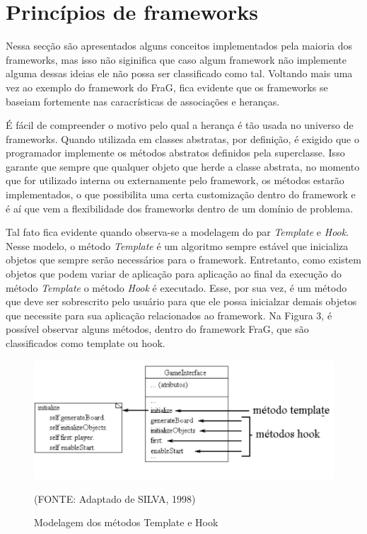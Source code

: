 \documentclass[
    12pt,       %
    openright,      %
    twoside,      %
    a4paper,      %
    english,      %
    french,       %
    spanish,      %
    brazil,       %
    ]{abntex2}
\begin{document}
      \section{Princípios de frameworks}
          Nessa secção são apresentados alguns conceitos implementados pela maioria
          dos frameworks, mas isso não siginifica que caso algum framework não implemente
          alguma dessas ideias ele não possa ser classificado como tal. Voltando mais uma
          vez ao exemplo do framework do FraG, fica evidente que os frameworks se baseiam
          fortemente nas caracrísticas de associações e heranças.

          É fácil de compreender o motivo pelo qual a herança é tão usada no universo de
          frameworks. Quando utilizada em classes abstratas, por definição, é exigido que
          o programador implemente os métodos abstratos definidos pela superclasse. Isso
          garante que sempre que qualquer objeto que herde a classe abstrata, no momento
          que for utilizado interna ou externamente pelo framework, os métodos estarão
          implementados, o que possibilita uma certa customização dentro do framework e
          é aí que vem a flexibilidade dos frameworks dentro de um domínio de problema.

          Tal fato fica evidente quando observa-se a modelagem do par \textit{Template} e
          \textit{Hook}. Nesse modelo, o método \textit{Template} é um algoritmo sempre
          estável que inicializa objetos que sempre serão necessários para o framework.
          Entretanto, como existem objetos que podem variar de aplicação para aplicação
          ao final da execução do método \textit{Template} o método \textit{Hook} é
          executado. Esse, por sua vez, é um método que deve ser sobrescrito pelo usuário
          para que ele possa inicialzar demais objetos que necessite para sua aplicação
          relacionados ao framework. Na Figura 3, é possível observar alguns métodos,
          dentro do framework FraG, que são classificados como template ou hook.

          \begin{figure}[htbp]
              \begin{center}
                  \includegraphics[width=1.0\textwidth]{img/templateHook.png}
              \end{center}
              \caption{\label{fig:passaro}Modelagem dos métodos Template e Hook}
              \begin{center}(FONTE: Adaptado de SILVA, 1998)\end{center}
          \end{figure}
\end{document}
